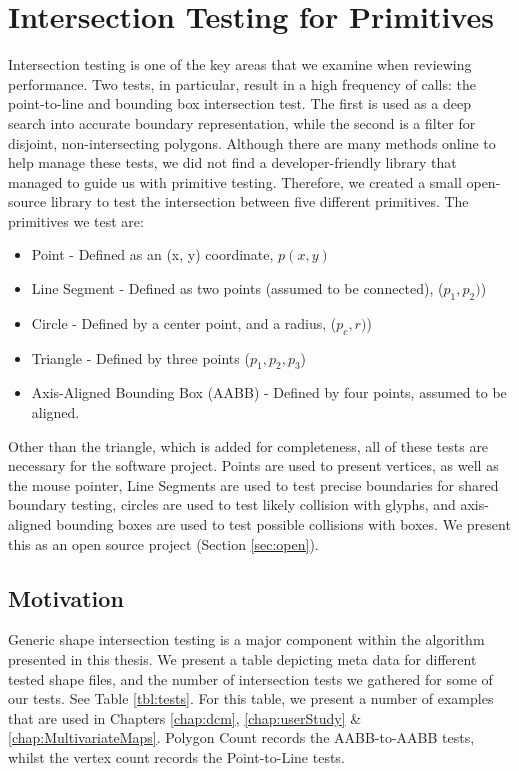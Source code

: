 \section{Intersection Testing for Primitives} \label{sec:testing}
Intersection testing is one of the key areas that we examine when reviewing performance. Two tests, in particular, result in a high frequency of calls: the point-to-line and bounding box intersection test. The first is used as a deep search into accurate boundary representation, while the second is a filter for disjoint, non-intersecting polygons. Although there are many methods online to help manage these tests, we did not find a developer-friendly library that managed to guide us with primitive testing. Therefore, we created a small open-source library to test the intersection between five different primitives. The primitives we test are:
\begin{itemize}
\item Point - Defined as an (x, y) coordinate, $p(x,y)$
\item Line Segment - Defined as two points (assumed to be connected), ($p_1,p_2)$)
\item Circle -  Defined by a center point, and a radius, ($p_c,r)$)
\item Triangle - Defined by three points ($p_1,p_2,p_3$)
\item Axis-Aligned Bounding Box (AABB) - Defined by four points, assumed to be aligned.
\end{itemize}

Other than the triangle, which is added for completeness, all of these tests are necessary for the software project. Points are used to present vertices, as well as the mouse pointer, Line Segments are used to test precise boundaries for shared boundary testing, circles are used to test likely collision with glyphs, and axis-aligned bounding boxes are used to test possible collisions with boxes. We present this as an open source project (Section \ref{sec:open}).

\subsection{Motivation}
Generic shape intersection testing is a major component within the algorithm presented in this thesis. We present a table depicting meta data for different tested shape files, and the number of intersection tests we gathered for some of our tests. See Table \ref{tbl:tests}. For this table, we present a number of examples that are used in Chapters \ref{chap:dcm}, \ref{chap:userStudy} \& \ref{chap:MultivariateMaps}. Polygon Count records the AABB-to-AABB tests, whilst the vertex count records the Point-to-Line tests.

